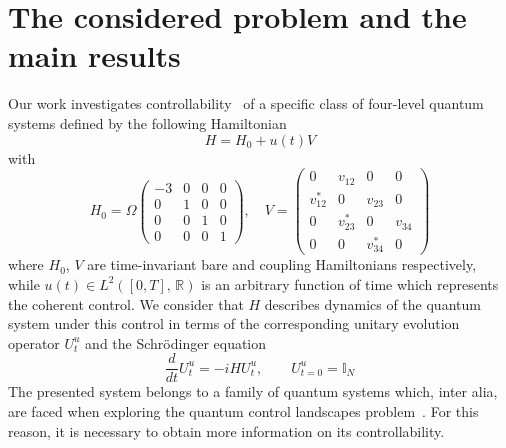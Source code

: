 \documentclass[12pt]{llncs}
\begin{document}
\section{The considered problem and the main results}
Our work \cite{nnKuznetsov} investigates controllability~\cite{nnAlbertini,nnBoscain,nnTurinici} of a specific class of four-level quantum systems defined by the following Hamiltonian
\begin{equation}
     H = H_{0} + u (t) V
\end{equation}
with
\begin{equation}\label{SK_hamiltonians}
    H_{0} =\Omega \begin{pmatrix} -3 & 0 & 0 & 0 \\
    0 & 1 & 0 & 0 \\
    0 & 0 & 1 & 0 \\
    0 & 0 & 0 & 1 \end{pmatrix}, \quad V = \begin{pmatrix} 0 & v_{12} & 0 & 0 \\
    v_{12}^{*} & 0 & v_{23} & 0 \\
    0 & v_{23}^{*} & 0 & v_{34} \\
    0 & 0 & v_{34}^{*} & 0 \end{pmatrix}
\end{equation}
where $H_{0}$, $ V $ are time-invariant bare and coupling Hamiltonians respectively, while $ u(t) \in L^{2} \left( [0, T], \, \mathbb{R} \right) $ is an arbitrary function of time which represents the coherent control. We consider that $ H $ describes dynamics of the quantum system under this control in terms of the corresponding unitary evolution operator $ U_{t}^{u} $ and the Schr\"{o}dinger equation
\begin{equation}
    \frac{d}{dt} U_{t}^{u} = -i H U_{t}^{u}, \qquad U_{t = 0}^{u} = \mathbb I_{N}
\end{equation}
The presented system belongs to a family of quantum systems which, inter alia, are faced when exploring the quantum control landscapes problem~\cite{Pechen}. For this reason, it is necessary to obtain more information on its controllability.
\end{document}
